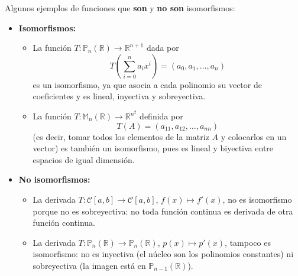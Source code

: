 \begin{example}
Algunos ejemplos de funciones que \textbf{son} y \textbf{no son} isomorfismos:

\begin{itemize}
    \item \textbf{Isomorfismos:}
    \begin{itemize}
        \item La función $T: \mathbb{P}_n(\mathbb{R}) \to \mathbb{R}^{n+1}$ dada por
        \[
        T\left(\sum_{i=0}^{n} a_i x^i\right) = (a_0, a_1, \ldots, a_n)
        \]
        es un isomorfismo, ya que asocia a cada polinomio su vector de coeficientes y es lineal, inyectiva y sobreyectiva.

        \item La función $T: \mathbb{M}_n(\mathbb{R}) \to \mathbb{R}^{n^2}$ definida por
        \[
        T(A) = (a_{11}, a_{12}, \ldots, a_{nn})
        \]
        (es decir, tomar todos los elementos de la matriz $A$ y colocarlos en un vector) es también un isomorfismo, pues es lineal y biyectiva entre espacios de igual dimensión.
    \end{itemize}

    \item \textbf{No isomorfismos:}
    \begin{itemize}
        \item La derivada $T: \mathcal{C}[a,b] \to \mathcal{C}[a,b]$, $f(x) \mapsto f'(x)$, no es isomorfismo porque no es sobreyectiva: no toda función continua es derivada de otra función continua.

        \item La derivada $T: \mathbb{P}_n(\mathbb{R}) \to \mathbb{P}_n(\mathbb{R})$, $p(x) \mapsto p'(x)$, tampoco es isomorfismo: no es inyectiva (el núcleo son los polinomios constantes) ni sobreyectiva (la imagen está en $\mathbb{P}_{n-1}(\mathbb{R})$).
    \end{itemize}
\end{itemize}
\end{example}

